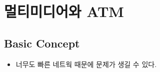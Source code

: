 



\clearpage
\chapter{멀티미디어와 ATM}

\section{Basic Concept}
\begin{itemize}
\item 너무도 빠른 네트웍 때문에 문제가 생길 수 있다.
\end{itemize}






